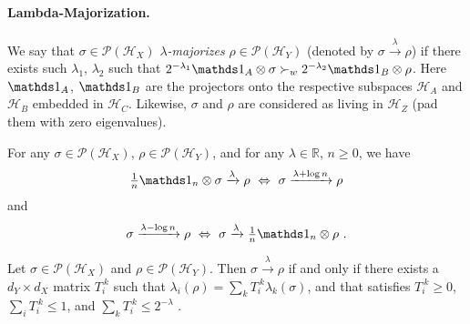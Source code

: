 \documentclass[11pt,a4paper]{article}
\def\Hs{\mathscr{H}}%
\newcommand{\lambdamaj}[1]{\xrightarrow{#1}}
\newcommand{\POps}{\mathscr{P}}
\begin{document}
\paragraph{Lambda-Majorization.} We say that $\sigma\in\POps(\Hs_X)$ {\em $\lambda$-majorizes}
$\rho\in\POps(\Hs_Y)$ (denoted by $\sigma\lambdamaj\lambda\rho$) if there exists such
$\lambda_1$, $\lambda_2$ such that
$2^{-\lambda_1}\Ident_A\otimes\sigma \succ_w 2^{-\lambda_2}\Ident_B\otimes\rho$.
Here $\Ident_A$, $\Ident_B$ are the projectors onto the respective subspaces $\Hs_A$ and $\Hs_B$
embedded in $\Hs_C$. Likewise, $\sigma$ and $\rho$ are considered as living in $\Hs_Z$ (pad them with zero
eigenvalues).

\begin{prop}
  \label{prop:LambdaMajMoveIdentitiesAround}
  For any $\sigma\in\POps(\Hs_X)$, $\rho\in\POps(\Hs_Y)$, and for any $\lambda\in\mathbb{R}$, $n\geqslant 0$, we have
  \begin{align*}
    {\textstyle\frac1n}\Ident_n\otimes\sigma\lambdamaj\lambda\rho  ~\Leftrightarrow~
    \sigma\lambdamaj{\lambda+\log n} \rho
  \end{align*}
  and
  \begin{align*}
    \sigma\lambdamaj{\lambda-\log n} \rho  ~\Leftrightarrow~
    \sigma\lambdamaj\lambda {\textstyle\frac1n}\Ident_n\otimes\rho\ .
  \end{align*}
\end{prop}

\begin{prop}
  \label{prop:LambdaMajTikFormal}
  Let $\sigma\in\POps(\Hs_X)$ and $\rho\in\POps(\Hs_Y)$. Then $\sigma\lambdamaj\lambda\rho$ if
  and only if there exists a $d_Y \times d_X$ matrix $T_i^{~k}$ such that
  $\lambda_i(\rho) = \sum_k T_i^{~k} \lambda_k(\sigma)$, and that satisfies
  $T_i^{~k}\geqslant 0$,
  $\sum_i T_i^{~k} \leqslant 1$, and
  $\sum_k T_i^{~k} \leqslant 2^{-\lambda}$ .
\end{prop}
\end{document}
